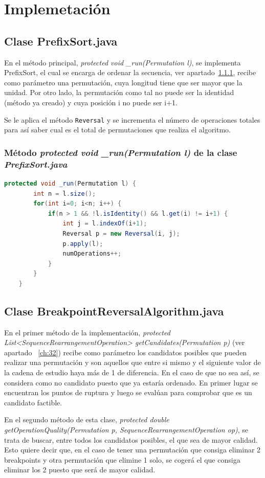 \documentclass[11pt,letterpaper]{article}
\begin{document}
\section{Implemetación}
\subsection{Clase PrefixSort.java}
En el método principal, \textit{protected void \_run(Permutation l)}, se implementa PrefixSort, el cual se encarga de ordenar la secuencia, ver apartado~\ref{ch:31}, recibe como parámetro una permutación, cuya longitud tiene que ser mayor que la unidad. Por otro lado, la  permutación como tal no puede ser la identidad (método ya creado) y cuya posición i no puede ser i+1.

Se le aplica el método \texttt{Reversal} y se incrementa el número de operaciones totales para así saber cual es el total de permutaciones que realiza el algoritmo.

\subsubsection{Método \textit{protected void \_run(Permutation l)} de la clase \textit{PrefixSort.java}}\label{ch:31}

\begin{lstlisting}[language = java]
	protected void _run(Permutation l) {
		int n = l.size();
		for(int i=0; i<n; i++) {
			if(n > 1 && !l.isIdentity() && l.get(i) != i+1) {
				int j = l.indexOf(i+1);
				Reversal p = new Reversal(i, j);
				p.apply(l);
				numOperations++;
			}
		}
	}
\end{lstlisting}

\subsection{Clase BreakpointReversalAlgorithm.java}
En el primer método de la implementación, \textit{protected List<SequenceRearrangementOperation> getCandidates(Permutation p)} (ver apartado ~\ref{ch:32}) recibe como parámetro los candidatos posibles que pueden realizar una permutación y son aquellos que entre si mismo y el siguiente valor de la cadena de estudio haya más de 1 de diferencia. En el caso de que no sea así, se considera como no candidato puesto que ya estaría ordenado. En primer lugar se encuentran los puntos de ruptura y luego se evalúan para comprobar que es un candidato factible.

En el segundo método de esta clase, \textit{protected double getOperationQuality(Permutation p, SequenceRearrangementOperation op)}, se trata de buscar, entre todos los candidatos posibles, el que sea de mayor calidad. Esto quiere decir que, en el caso de tener una permutación que consiga eliminar 2 breakpoints y otra permutación que elimine 1 solo, se cogerá el que consiga eliminar los 2 puesto que será de mayor calidad.
\end{document}
